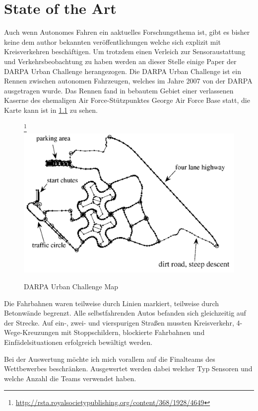 \documentclass[11pt,oneside,openright]{mpreport}
\begin{document}
\chapter{State of the Art}
Auch wenn Autonomes Fahren ein aaktuelles Forschungsthema ist, gibt es bisher keine dem author bekannten veröffentlichungen welche sich explizit mit Kreisverkehren beschäftigen.
Um trotzdem einen Verleich zur Sensoraustattung und Verkehrsbeobachtung zu haben werden an dieser Stelle einige Paper der \acs{DARPA} Urban Challenge herangezogen.
Die DARPA Urban Challenge ist ein Rennen zwischen autonomen Fahrzeugen, welches im Jahre 2007 von der \ac{DARPA} ausgetragen wurde. \cite{Buehler2010} Das Rennen fand in bebautem Gebiet
einer verlassenen Kaserne des ehemaligen Air Force-Stützpunktes George Air Force Base statt, die Karte kann ist in \cref{darpa_map} zu sehen.

\begin{figure}[!ht]
\caption{ \acs{DARPA} Urban Challenge Map }
\footnote{\url{http://rsta.royalsocietypublishing.org/content/368/1928/4649}}
\includegraphics[width=\textwidth]{bilder/darpa_map_bw.png}
\label{darpa_map}
\end{figure}

Die Fahrbahnen waren teilweise durch Linien markiert, teilweise durch Betonwände begrenzt. Alle selbstfahrenden Autos befanden sich gleichzeitig auf der Strecke. 
Auf ein-, zwei- und vierspurigen Straßen mussten Kreisverkehr, 4-Wege-Kreuzungen mit Stoppschildern, blockierte Fahrbahnen und Einfädelsituationen erfolgreich bewältigt werden.
 
Bei der Auswertung  möchte ich mich vorallem auf die Finalteams des Wettbewerbes beschränken. Ausgewertet werden dabei welcher Typ Sensoren und welche Anzahl die Teams verwendet haben.
\end{document}
